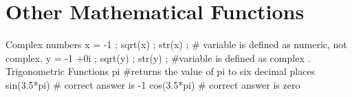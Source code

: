 \section{Other Mathematical Functions}
Complex numbers
x = -1 ;  sqrt(x)  ;  str(x) ; 	# variable is defined as numeric, not complex.
y = -1 +0i ;  sqrt(y)  ;  str(y) ;    	#variable is defined as complex .
Trigonometric  Functions
pi				#returns the value of pi to six decimal places
sin(3.5*pi)			# correct answer is -1
cos(3.5*pi)			# correct answer is zero

